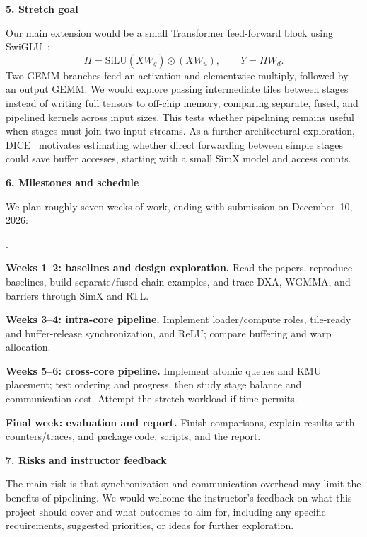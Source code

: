 \documentclass[11pt,letterpaper]{article}
\newcommand{\proposalheading}[1]{%
  \par\addvspace{0.55em}\noindent\textbf{#1}\par\nobreak\vspace{0.08em}}
\newenvironment{compactitems}{%
  \begin{list}{\arabic{enumi}.}{\usecounter{enumi}%
  \setlength{\itemsep}{0.18em}\setlength{\topsep}{0.2em}%
  \setlength{\partopsep}{0pt}\setlength{\parsep}{0pt}}%
}{\end{list}}
\begin{document}
\proposalheading{5. Stretch goal}
Our main extension would be a small Transformer feed-forward block using
SwiGLU~\cite{glu}:
\[
H=\mathrm{SiLU}(XW_g)\odot(XW_u),\qquad Y=HW_d.
\]
Two GEMM branches feed an activation and elementwise multiply, followed by an
output GEMM. We would explore passing intermediate tiles between stages instead of
writing full tensors to off-chip memory, comparing separate, fused, and pipelined
kernels across input sizes. This tests whether pipelining remains useful when stages
must join two input streams.
As a further architectural exploration, DICE~\cite{dice} motivates estimating
whether direct forwarding between simple stages could save buffer accesses,
starting with a small SimX model and access counts.

\proposalheading{6. Milestones and schedule}
We plan roughly seven weeks of work, ending with submission on December~10, 2026:
\begin{compactitems}
\item \textbf{Weeks 1--2: baselines and design exploration.}
Read the papers, reproduce baselines, build separate/fused chain examples,
and trace DXA, WGMMA, and barriers through SimX and RTL.
\item \textbf{Weeks 3--4: intra-core pipeline.}
Implement loader/compute roles, tile-ready and buffer-release synchronization,
and ReLU; compare buffering and warp allocation.
\item \textbf{Weeks 5--6: cross-core pipeline.}
Implement atomic queues and KMU placement; test ordering and progress,
then study stage balance and communication cost. Attempt the stretch workload if time permits.
\item \textbf{Final week: evaluation and report.}
Finish comparisons, explain results with counters/traces, and package code,
scripts, and the report.
\end{compactitems}

\proposalheading{7. Risks and instructor feedback}
The main risk is that synchronization and communication overhead may limit the
benefits of pipelining. We would welcome the instructor's feedback on what this
project should cover and what outcomes to aim for, including any specific
requirements, suggested priorities, or ideas for further exploration.
\end{document}
